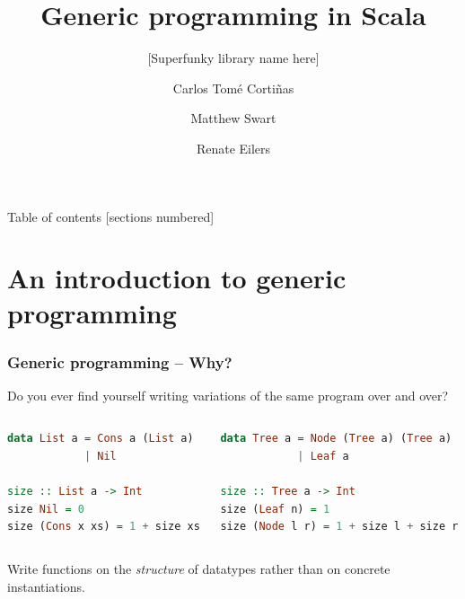 \documentclass[10pt]{beamer}
\title{Generic programming in Scala}
\subtitle{[Superfunky library name here]}
\date{}
\author{Carlos Tomé Cortiñas
\and Matthew Swart
\and Renate Eilers}
\institute{Department of Information and Computing Sciences, Utrecht University}
\begin{document}
\maketitle

\begin{frame}{Table of contents}
  [sections numbered]
  \tableofcontents[hideallsubsections]
\end{frame}

\section{An introduction to generic programming}

\begin{frame}[fragile]
\frametitle{Generic programming -- Why?}

Do you ever find yourself writing variations of the same program over and over?

\begin{columns}
\begin{column}{.40\textwidth}
\begin{lstlisting}[language=Haskell,basicstyle=\ttfamily\scriptsize]
data List a = Cons a (List a) 
            | Nil

size :: List a -> Int
size Nil = 0
size (Cons x xs) = 1 + size xs
\end{lstlisting}
\end{column}
\begin{column}{.48\textwidth}
\begin{lstlisting}[language=Haskell,basicstyle=\ttfamily\scriptsize]
data Tree a = Node (Tree a) (Tree a) 
            | Leaf a

size :: Tree a -> Int
size (Leaf n) = 1
size (Node l r) = 1 + size l + size r
\end{lstlisting}
\end{column}
\end{columns}

Write functions on the {\color{green}\emph{structure}} of datatypes rather than on concrete instantiations.
\end{frame}
\end{document}
